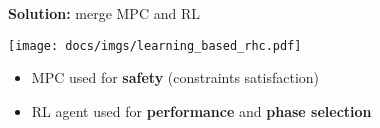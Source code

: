 \bigskip
\Large{
	\centering
	\textbf{Solution:} merge MPC and RL 
	
}
\bigskip
\centering
\texttt{[image: docs/imgs/learning\_based\_rhc.pdf]}
\vskip1cm
\begin{itemize}
	\item[\themarker] MPC used for \textbf{safety} (constraints satisfaction)
	\item[\themarker] RL agent used for \textbf{performance} and \textbf{phase selection}
\end{itemize}
\bigskip